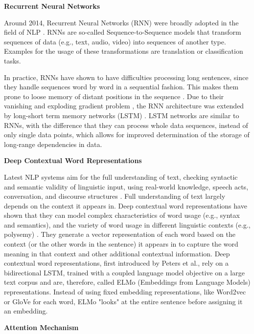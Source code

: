\textbf{Recurrent Neural Networks}
    \label{sec:RNNs}

Around 2014, Recurrent Neural Networks (RNN) were broadly adopted in the field of NLP \cite{jozefowicz2016exploring}. RNNs are so-called Sequence-to-Sequence models that transform sequences of data (e.g., text, audio, video) into sequences of another type. Examples for the usage of these transformations are translation or classification tasks.

In practice, RNNs have shown to have difficulties processing long sentences, since they handle sequences word by word in a sequential fashion. This makes them prone to loose memory of distant positions in the sequence \cite{mikolov2010recurrent}.
Due to their vanishing and exploding gradient problem \cite{pascanu2013difficulty}, the RNN architecture was extended by long-short term memory networks (LSTM) \cite{hochreiter1997long, graves2005framewise}. 
LSTM networks are similar to RNNs, with the difference that they can process whole data sequences, instead of only single data points, which allows for improved determination of the storage of long-range dependencies in data. 

\textbf{Deep Contextual Word Representations}

Latest NLP systems aim for the full understanding of text, checking syntactic and semantic validity of linguistic input, using real-world knowledge, speech acts, conversation, and discourse structures \cite{kumar2011natural}.
Full understanding of text largely depends on the context it appears in. 
Deep contextual word representations have shown that they can model complex characteristics of word usage (e.g., syntax and semantics), and the variety of word usage in different linguistic contexts (e.g., polysemy) \cite{peters2018deep}. They generate a vector representation of each word based on the context (or the other words in the sentence) it appears in to capture the word meaning in that context and other additional contextual information. Deep contextual word representations, first introduced by Peters et al., rely on a bidirectional LSTM, trained with a coupled language model objective on a large text corpus and are, therefore, called ELMo (Embeddings from Language Models) representations.
Instead of using fixed embedding representations, like Word2vec or GloVe \cite{pennington2014glove} for each word, ELMo "looks" at the entire sentence before assigning it an embedding. 

 \textbf{Attention Mechanism}
\label{sec:attention}

